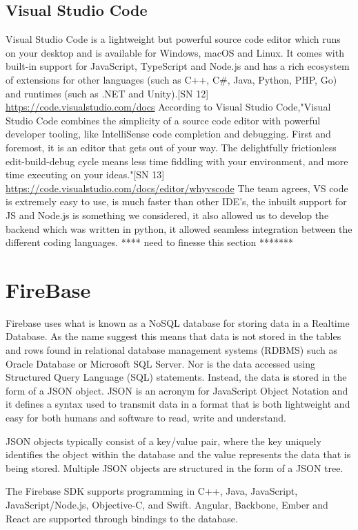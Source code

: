 \subsection{Visual Studio Code}
Visual Studio Code is a lightweight but powerful source code editor which runs on your desktop and is available for Windows, macOS and Linux. It comes with built-in support for JavaScript, TypeScript and Node.js and has a rich ecosystem of extensions for other languages (such as C++, C\#, Java, Python, PHP, Go) and runtimes (such as .NET and Unity).[SN 12] \url{https://code.visualstudio.com/docs}
According to Visual Studio Code,"Visual Studio Code combines the simplicity of a source code editor with powerful developer tooling, like IntelliSense code completion and debugging.
First and foremost, it is an editor that gets out of your way. The delightfully frictionless edit-build-debug cycle means less time fiddling with your environment, and more time executing on your ideas."[SN 13] \url{https://code.visualstudio.com/docs/editor/whyvscode}
The team agrees, VS code is extremely easy to use, is much faster than other IDE's, the inbuilt support for JS and Node.js is something we considered, it also allowed us to develop the backend which was written in python, it allowed seamless integration between the different coding languages. **** need to finesse this section *******


\section{FireBase}
Firebase uses what is known as a NoSQL database for storing data in a Realtime Database. As the name suggest this means that data is not stored in the tables and rows found in relational database management systems (RDBMS) such as Oracle Database or Microsoft SQL Server. Nor is the data accessed using Structured Query Language (SQL) statements. Instead, the data is stored in the form of a JSON object. JSON is an acronym for JavaScript Object Notation and it defines a syntax used to transmit data in a format that is both lightweight and easy for both humans and software to read, write and understand.

JSON objects typically consist of a key/value pair, where the key uniquely identifies the object within the database and the value represents the data that is being stored. Multiple JSON objects are structured in the form of a JSON tree.

The Firebase SDK supports programming in C++, Java, JavaScript, JavaScript/Node.js, Objective-C, and Swift. Angular, Backbone, Ember and React are supported through bindings to the database.
